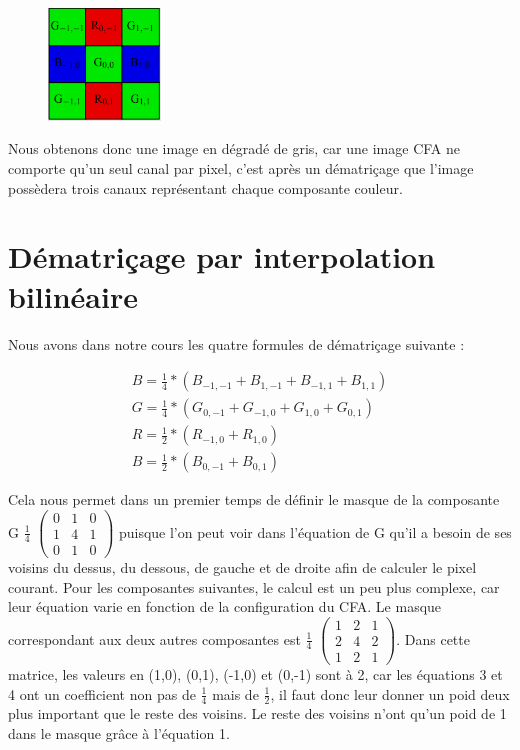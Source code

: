 \documentclass[a4paper,11pt]{article}
\begin{document}
  \begin{figure}[H]
  \center
   \includegraphics[width=3cm]{bayerBGB.png}
  \end{figure}
  
  Nous obtenons donc une image en dégradé de gris, car une image CFA ne comporte qu'un seul canal par pixel,
  c'est après un dématriçage que l'image possèdera trois canaux représentant chaque composante couleur.
  
  \section{Dématriçage par interpolation bilinéaire}
  Nous avons dans notre cours les quatre formules de dématriçage suivante :
  
  \begin{align}
  B = \frac{1}{4} * (B_{-1,-1}+B_{1,-1}+B_{-1,1}+B_{1,1})\\
  G = \frac{1}{4} * (G_{0,-1}+G_{-1,0}+G_{1,0}+G_{0,1})\\
  R = \frac{1}{2} * (R_{-1,0}+R_{1,0})\\
  B = \frac{1}{2} * (B_{0,-1}+B_{0,1})
  \end{align}
  
  Cela nous permet dans un premier temps de définir le masque de la composante G $\frac{1}{4}$
  $\begin{pmatrix}
   0 & 1 & 0\\
   1 & 4 & 1\\
   0 & 1 & 0
  \end{pmatrix}$
  puisque l'on peut voir dans l'équation de G qu'il a besoin de ses voisins du dessus, du dessous,
  de gauche et de droite afin de calculer le pixel courant. Pour les composantes suivantes, le calcul
  est un peu plus complexe, car leur équation varie en fonction de la configuration du CFA. Le masque
  correspondant aux deux autres composantes est $\frac{1}{4}$
  $\begin{pmatrix}
   1 & 2 & 1\\
   2 & 4 & 2\\
   1 & 2 & 1
  \end{pmatrix}$. Dans cette matrice, les valeurs en (1,0), (0,1), (-1,0) et (0,-1) sont à 2, car 
  les équations 3 et 4 ont un coefficient non pas de $\frac{1}{4}$ mais de $\frac{1}{2}$, il faut
  donc leur donner un poid deux plus important que le reste des voisins. Le reste des voisins n'ont 
  qu'un poid de 1 dans le masque grâce à l'équation 1.\\
  
\end{document}

